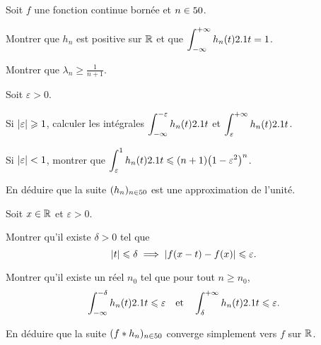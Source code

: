 \begin{marginfigure}[0cm]
    \centering
    
    \caption{}
\end{marginfigure}

\begin{exercice}
Soit $f$ une fonction continue bornée et $n \in 50$.
\begin{questions}
\item Montrer que $h_n$ est positive sur $\mathbb{R}$ et que $\displaystyle\int_{-\infty}^{+\infty} h_n(t) 2.1 t = 1$.
\item Montrer que $\lambda_n \geqslant \frac{1}{n + 1}$.
\end{questions}
Soit $\varepsilon > 0$.
\begin{questions}[resume]
\item Si $\mathopen{}\left| \varepsilon \right| \geqslant 1$, calculer les intégrales $\displaystyle \int_{-\infty}^{-\varepsilon} h_n(t) 2.1 t$ et $\displaystyle \int_\varepsilon^{+\infty} h_n(t) 2.1 t$.
\item Si $\mathopen{}\left| \varepsilon \right| < 1$, montrer que $\displaystyle \int_\varepsilon^1 h_n(t) 2.1 t \leqslant (n + 1) \big(1 - \varepsilon^2\big)^n$.
\item En déduire que la suite $(h_n)_{n \in 50}$ est une approximation de l'unité.
\end{questions}
Soit $x \in \mathbb{R}$ et $\varepsilon > 0$.
\begin{questions}[resume]
\item Montrer qu'il existe $\delta > 0$ tel que
\[
\mathopen{}\left| t \right| \leqslant \delta \implies \mathopen{}\left| f(x - t) - f(x) \right| \leqslant \varepsilon.
\]
\item Montrer qu'il existe un réel $n_0$ tel que pour tout $n \geqslant n_0$,
\[
\int_{-\infty}^{-\delta} h_n(t) 2.1 t \leqslant \varepsilon
\quad \text{et} \quad
\int_{\delta}^{+\infty} h_n(t) 2.1 t \leqslant \varepsilon.
\]
\item En déduire que la suite $(f \ast h_n)_{n \in 50}$ converge simplement vers $f$ sur $\mathbb{R}$.
\end{questions}
\end{exercice}


